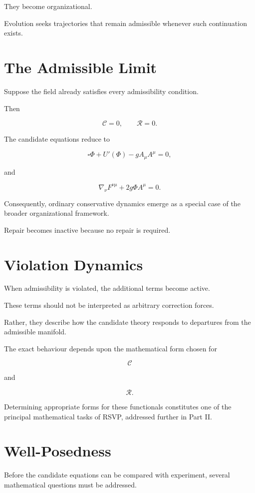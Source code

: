 \documentclass[11pt,oneside]{book}
\numberwithin{equation}{chapter}
\theoremstyle{definition}
\theoremstyle{plain}
\begin{document}
They become organizational.

Evolution seeks trajectories that remain admissible whenever such
continuation exists.

\section{The Admissible Limit}

Suppose the field already satisfies every admissibility condition.

Then

\[
\mathcal C=0,
\qquad
\mathcal R=0.
\]

The candidate equations reduce to

\[
\square\Phi
+
U'(\Phi)
-
gA_\mu A^\mu
=
0,
\]

and

\[
\nabla_\nu
F^{\nu\mu}
+
2g\Phi A^\mu
=
0.
\]

Consequently, ordinary conservative dynamics emerge as a special case of the
broader organizational framework.

Repair becomes inactive because no repair is required.

\section{Violation Dynamics}

When admissibility is violated, the additional terms become active.

These terms should not be interpreted as arbitrary correction forces.

Rather, they describe how the candidate theory responds to departures from
the admissible manifold.

The exact behaviour depends upon the mathematical form chosen for

\[
\mathcal C
\]

and

\[
\mathcal R.
\]

Determining appropriate forms for these functionals constitutes one of the
principal mathematical tasks of RSVP, addressed further in Part II.

\section{Well-Posedness}

Before the candidate equations can be compared with experiment, several
mathematical questions must be addressed.
\end{document}

